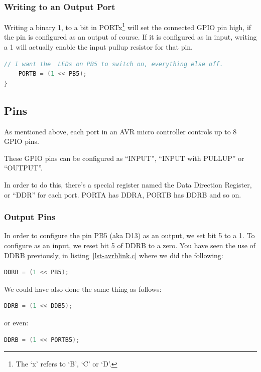 \subsubsection{Writing to an Output Port}\label{avr-ports-output-writing}
Writing a binary 1, to a bit in PORTx\footnote{The `x' refers to `B', `C' or `D'.} will set the connected GPIO pin high, if the pin is configured as an output of course. If it is configured as in input, writing a 1 will actually enable the input pullup resistor for  that pin.

\begin{lstlisting}[language=C,numbers={none}]
	// I want the  LEDs on PB5 to switch on, everything else off.
	PORTB = (1 << PB5);
}
\end{lstlisting}


\subsection{Pins}\label{avr-pins}

As mentioned above, each port in an AVR micro controller controls up to 8 GPIO pins. 

These GPIO pins can be configured as ``INPUT'', ``INPUT with PULLUP'' or ``OUTPUT''. 

In order to do this, there's a special register named the Data Direction Register, or ``DDR'' for each port. PORTA has DDRA, PORTB has DDRB and so on.

\subsubsection{Output Pins}\label{avr-pins-output}
In order to configure the pin PB5 (aka  D13) as an output, we set bit 5 to a 1. To configure as an input, we reset bit 5 of DDRB to a zero. You have seen the use of DDRB previously, in listing~\ref{lst-avrblink.c} where we did the following:

\begin{lstlisting}[language=C,numbers={none}]
	DDRB = (1 << PB5);
\end{lstlisting}

We could have also done the same thing as follows:

\begin{lstlisting}[language=C,numbers={none}]
	DDRB = (1 << DDB5);
\end{lstlisting}

or even:

\begin{lstlisting}[language=C,numbers={none}]
	DDRB = (1 << PORTB5);
\end{lstlisting}

